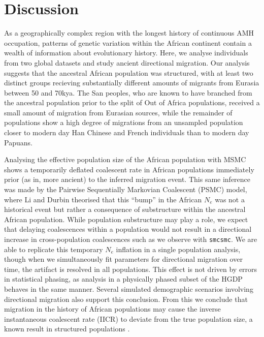 \documentclass{article}
\begin{document}

\section{Discussion}

As a geographically complex region with the longest history of continuous AMH occupation, patterns of genetic variation within the African continent contain a wealth of information about evolutionary history. Here, we analyse individuals from two global datasets and study ancient directional migration. Our analysis suggests that the ancestral African population was structured, with at least two distinct groups recieving substantially different amounts of migrants from Eurasia between 50 and 70kya. The San peoples, who are known to have branched from the ancestral population prior to the split of Out of Africa populations, received a small amount of migration from Eurasian sources, while the remainder of populations show a high degree of migrations from an unsampled population closer to modern day Han Chinese and French individuals than to modern day Papuans. 

Analysing the effective population size of the African population with MSMC shows a temporarily deflated coalescent rate in African populations immediately prior (as in, more ancient) to the inferred migration event. This same inference was made by the Pairwise Sequentially Markovian Coalescent (PSMC) model, where Li and Durbin theorised that this ``bump'' in the African $N_e$ was not a historical event but rather a consequence of substructure within the ancestral African population. While population substructure may play a role, we expect that delaying coalescences within a population would not result in a directional increase in cross-population coalescences such as we observe with {\tt smcsmc}. We are able to replicate this temporary $N_e$ inflation in a single population analysis, though when we simultaneously fit parameters for directional migration over time, the artifact is resolved in all populations. This effect is not driven by errors in statistical phasing, as analysis in a physically phased subset of the HGDP behaves in the same manner. Several simulated demographic scenarios involving directional migration also support this conclusion. From this we conclude that migration in the history of African populations may cause the inverse instantaneous coalescent rate (IICR) to deviate from the true population size, a known result in structured populations \cite{Chikhi2018}.
\end{document}

